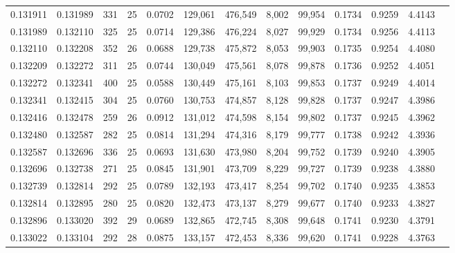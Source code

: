 \begin{tabular}{rrrrrrrrrrrrr}
0.131911 & 0.131989 & 331 &  25 &                                     0.0702 & 129,061 & 476,549 &   8,002 &  99,954 & 0.1734 & 0.9259 & 4.4143 \\
0.131989 & 0.132110 & 325 &  25 &                                     0.0714 & 129,386 & 476,224 &   8,027 &  99,929 & 0.1734 & 0.9256 & 4.4113 \\
0.132110 & 0.132208 & 352 &  26 &                                     0.0688 & 129,738 & 475,872 &   8,053 &  99,903 & 0.1735 & 0.9254 & 4.4080 \\
0.132209 & 0.132272 & 311 &  25 &                                     0.0744 & 130,049 & 475,561 &   8,078 &  99,878 & 0.1736 & 0.9252 & 4.4051 \\
0.132272 & 0.132341 & 400 &  25 &                                     0.0588 & 130,449 & 475,161 &   8,103 &  99,853 & 0.1737 & 0.9249 & 4.4014 \\
0.132341 & 0.132415 & 304 &  25 &                                     0.0760 & 130,753 & 474,857 &   8,128 &  99,828 & 0.1737 & 0.9247 & 4.3986 \\
0.132416 & 0.132478 & 259 &  26 &                                     0.0912 & 131,012 & 474,598 &   8,154 &  99,802 & 0.1737 & 0.9245 & 4.3962 \\
0.132480 & 0.132587 & 282 &  25 &                                     0.0814 & 131,294 & 474,316 &   8,179 &  99,777 & 0.1738 & 0.9242 & 4.3936 \\
0.132587 & 0.132696 & 336 &  25 &                                     0.0693 & 131,630 & 473,980 &   8,204 &  99,752 & 0.1739 & 0.9240 & 4.3905 \\
0.132696 & 0.132738 & 271 &  25 &                                     0.0845 & 131,901 & 473,709 &   8,229 &  99,727 & 0.1739 & 0.9238 & 4.3880 \\
0.132739 & 0.132814 & 292 &  25 &                                     0.0789 & 132,193 & 473,417 &   8,254 &  99,702 & 0.1740 & 0.9235 & 4.3853 \\
0.132814 & 0.132895 & 280 &  25 &                                     0.0820 & 132,473 & 473,137 &   8,279 &  99,677 & 0.1740 & 0.9233 & 4.3827 \\
0.132896 & 0.133020 & 392 &  29 &                                     0.0689 & 132,865 & 472,745 &   8,308 &  99,648 & 0.1741 & 0.9230 & 4.3791 \\
0.133022 & 0.133104 & 292 &  28 &                                     0.0875 & 133,157 & 472,453 &   8,336 &  99,620 & 0.1741 & 0.9228 & 4.3763 \\

\end{tabular}
